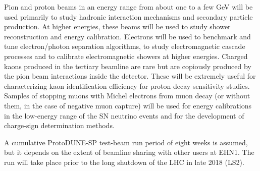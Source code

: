 Pion and proton beams in an energy range from about one to a few GeV will be used primarily to study hadronic interaction mechanisms and secondary particle production.  At higher energies, these beams will be used to study shower reconstruction and energy calibration. Electrons will be used to benchmark and tune electron/photon separation algorithms, to study electromagnetic cascade processes and to calibrate electromagnetic showers at higher energies. Charged kaons produced in the tertiary beamline are rare but are copiously produced by the pion beam interactions inside the detector. These will be extremely useful for characterizing kaon identification efficiency for proton decay sensitivity studies.  Samples of stopping muons with Michel electrons from muon decay (or without them, in the case of negative muon capture) will be used for energy calibrations in the low-energy range of the SN neutrino events and for the development of charge-sign determination methods. 

A cumulative ProtoDUNE-SP test-beam run period of eight weeks is assumed, but it depends on the extent of beamline sharing with other users at EHN1. The run will take place prior to the long shutdown of the LHC in late 2018 (LS2). 

